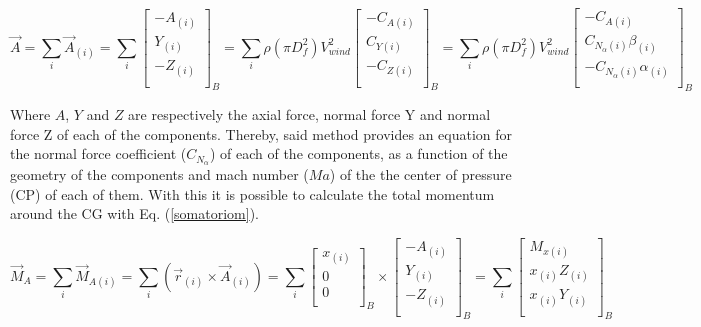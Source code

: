 \documentclass[10pt,fleqn,a4paper,twoside]{article}
\begin{document}
\begin{equation}
\vec{A}=\sum_{i}\vec{A}_{(i)}=\sum_{i}
\begin{bmatrix}
-A_{(i)} \\
Y_{(i)} \\
-Z_{(i)} \\
\end{bmatrix}
_{B} = \sum_{i} \rho (\pi D_{f}^{2})V_{wind}^{2}
\begin{bmatrix}
-C_{A (i)} \\
C_{Y (i)} \\
-C_{Z (i)} \\
\end{bmatrix}
_{B} = \sum_{i} \rho (\pi D_{f}^{2})V_{wind}^{2}
\begin{bmatrix}
-C_{A (i)} \\
C_{N_{\alpha} (i)}\beta_{(i)} \\
-C_{N_{\alpha} (i)}\alpha_{(i)} \\
\end{bmatrix}
_{B}
\label{cnalpha}
\end{equation}


Where $ A $, $ Y $ and $ Z $ are respectively the axial force, normal force Y and normal force Z of each of the components. Thereby, said method provides an equation for the normal force coefficient ($ C_{N_{\alpha}} $) of each of the components, as a function of the geometry of the components and mach number ($ Ma $) of the the center of pressure (CP) of each of them. With this it is possible to calculate the total momentum around the CG with Eq. (\ref{somatoriom}).


\begin{equation}
\vec{M}_{A}=\sum_{i} \vec{M}_{A (i)}=\sum_{i} (\vec{r}_{(i)}\times \vec{A}_{(i)})
= \sum_{i}  
\begin{bmatrix}
x_{(i)} \\
0\\
0\\
\end{bmatrix}
_{B} \times
\begin{bmatrix}
-A_{(i)} \\
Y_{(i)} \\
-Z_{(i)} \\
\end{bmatrix}
_{B}= \sum_{i} 
\begin{bmatrix}
M_{x (i)} \\
x_{(i)}Z_{(i)} \\
x_{(i)}Y_{(i)} \\
\end{bmatrix}
_{B}
\label{somatoriom}
\end{equation}
\end{document}
